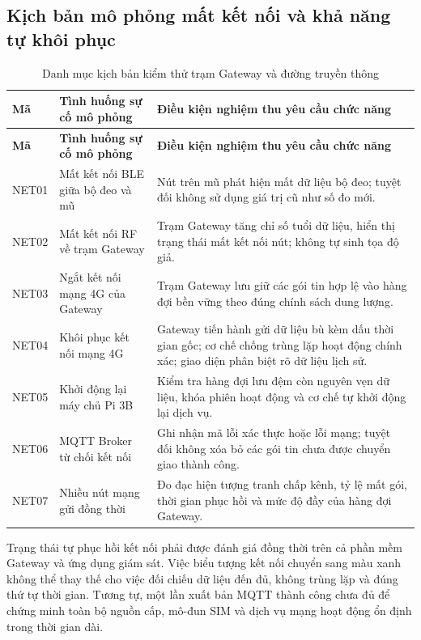 \subsection{Kịch bản mô phỏng mất kết nối và khả năng tự khôi phục}
\begingroup\SmallTable
\begin{longtable}{|P{39bp}|P{150bp}|P{219bp}|}
\caption{Danh mục kịch bản kiểm thử trạm Gateway và đường truyền thông}\label{tab:nettest}\\\hline
\textbf{Mã}&\textbf{Tình huống sự cố mô phỏng}&\textbf{Điều kiện nghiệm thu yêu cầu chức năng}\\\hline\endfirsthead
\hline\textbf{Mã}&\textbf{Tình huống sự cố mô phỏng}&\textbf{Điều kiện nghiệm thu yêu cầu chức năng}\\\hline\endhead
NET01&Mất kết nối BLE giữa bộ đeo và mũ&Nút trên mũ phát hiện mất dữ liệu bộ đeo; tuyệt đối không sử dụng giá trị cũ như số đo mới.\\\hline
NET02&Mất kết nối RF về trạm Gateway&Trạm Gateway tăng chỉ số tuổi dữ liệu, hiển thị trạng thái mất kết nối nút; không tự sinh tọa độ giả.\\\hline
NET03&Ngắt kết nối mạng 4G của Gateway&Trạm Gateway lưu giữ các gói tin hợp lệ vào hàng đợi bền vững theo đúng chính sách dung lượng.\\\hline
NET04&Khôi phục kết nối mạng 4G&Gateway tiến hành gửi dữ liệu bù kèm dấu thời gian gốc; cơ chế chống trùng lặp hoạt động chính xác; giao diện phân biệt rõ dữ liệu lịch sử.\\\hline
NET05&Khởi động lại máy chủ Pi 3B&Kiểm tra hàng đợi lưu đệm còn nguyên vẹn dữ liệu, khóa phiên hoạt động và cơ chế tự khởi động lại dịch vụ.\\\hline
NET06&MQTT Broker từ chối kết nối&Ghi nhận mã lỗi xác thực hoặc lỗi mạng; tuyệt đối không xóa bỏ các gói tin chưa được chuyển giao thành công.\\\hline
NET07&Nhiều nút mạng gửi đồng thời&Đo đạc hiện tượng tranh chấp kênh, tỷ lệ mất gói, thời gian phục hồi và mức độ đầy của hàng đợi Gateway.\\\hline
\end{longtable}\endgroup

Trạng thái tự phục hồi kết nối phải được đánh giá đồng thời trên cả phần mềm Gateway và ứng dụng giám sát. Việc biểu tượng kết nối chuyển sang màu xanh không thể thay thế cho việc đối chiếu dữ liệu đến đủ, không trùng lặp và đúng thứ tự thời gian. Tương tự, một lần xuất bản MQTT thành công chưa đủ để chứng minh toàn bộ nguồn cấp, mô-đun SIM và dịch vụ mạng hoạt động ổn định trong thời gian dài.


